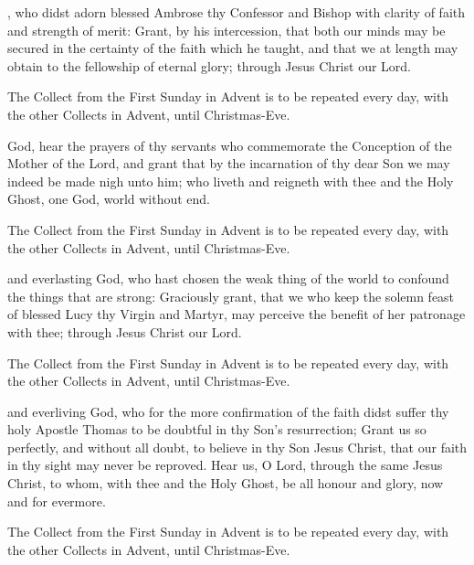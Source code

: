 , who didst adorn blessed Ambrose thy Confessor and Bishop with clarity of faith and strength of merit: Grant, by his intercession, that both our minds may be secured in the certainty of the faith which he taught, and that we at length may obtain to the fellowship of eternal glory; through Jesus Christ our Lord.
\begin{secrubric}
The Collect from the First Sunday in Advent is to be repeated every day, with the other Collects in Advent, until Christmas-Eve.
\end{secrubric}

 God, hear the prayers of thy servants who commemorate the Conception of the Mother of the Lord, and grant that by the incarnation of thy dear Son we may indeed be made nigh unto him; who liveth and reigneth with thee and the Holy Ghost, one God, world without end.
\begin{secrubric}
The Collect from the First Sunday in Advent is to be repeated every day, with the other Collects in Advent, until Christmas-Eve.
\end{secrubric}

 and everlasting God, who hast chosen the weak thing of the world to confound the things that are strong: Graciously grant, that we who keep the solemn feast of blessed Lucy thy Virgin and Martyr, may perceive the benefit of her patronage with thee; through Jesus Christ our Lord.
\begin{secrubric}
The Collect from the First Sunday in Advent is to be repeated every day, with the other Collects in Advent, until Christmas-Eve.
\end{secrubric}

 and everliving God, who for the more confirmation of the faith didst suffer thy holy Apostle Thomas to be doubtful in thy Son's resurrection; Grant us so perfectly, and without all doubt, to believe in thy Son Jesus Christ, that our faith in thy sight may never be reproved. Hear us, O Lord, through the same Jesus Christ, to whom, with thee and the Holy Ghost, be all honour and glory, now and for evermore.
\begin{secrubric}
The Collect from the First Sunday in Advent is to be repeated every day, with the other Collects in Advent, until Christmas-Eve.
\end{secrubric}

